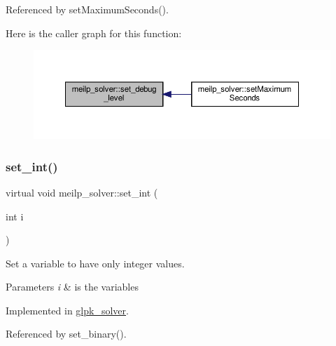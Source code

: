 Referenced by set\+Maximum\+Seconds().

Here is the caller graph for this function\+:
\nopagebreak
\begin{figure}[H]
\begin{center}
\leavevmode
\includegraphics[width=350pt]{dc/d7f/classmeilp__solver_a13730dbd89312c75d175d5e7f66bb358_icgraph}
\end{center}
\end{figure}
\mbox{\label{classmeilp__solver_aa9d0154f8daf67a0d815b76c6739546a}} 
\subsubsection{\texorpdfstring{set\+\_\+int()}{set\_int()}}
{\footnotesize\ttfamily virtual void meilp\+\_\+solver\+::set\+\_\+int (\begin{DoxyParamCaption}\item[{int}]{i }\end{DoxyParamCaption})\hspace{0.3cm}{\ttfamily [pure virtual]}}



Set a variable to have only integer values. 


\begin{DoxyParams}{Parameters}
{\em i} & is the variables \\
\hline
\end{DoxyParams}


Implemented in \hyperlink{classglpk__solver_a036f03d3c3fb34341846be7f077b565d}{glpk\+\_\+solver}.



Referenced by set\+\_\+binary().

